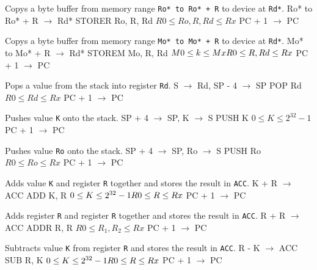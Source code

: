 \documentclass[titlepage]{scrartcl}
\begin{document}
{Copys a byte buffer from memory range \texttt{Ro* to Ro* + R} to device at \texttt{Rd*}.}
{Ro* to Ro* + R $\rightarrow$ Rd*}
{STORER Ro, R, Rd}
{$R0 \leq Ro, R, Rd \leq Rx$}
{PC + 1 $\rightarrow$ PC}
{}
{\srtable{}{}{}{}}

{Copys a byte buffer from memory range \texttt{Mo* to Mo* + R} to device at \texttt{Rd*}.}
{Mo* to Mo* + R $\rightarrow$ Rd*}
{STOREM Mo, R, Rd}
{$M0 \leq k \leq Mx \hfill \break R0 \leq R, Rd \leq Rx$}
{PC + 1 $\rightarrow$ PC}
{}
{\srtable{}{}{}{}}

{Pops a value from the stack into register \texttt{Rd}.}
{S $\rightarrow$ Rd, SP - 4 $\rightarrow$ SP}
{POP Rd}
{$R0 \leq Rd \leq Rx$}
{PC + 1 $\rightarrow$ PC}
{}
{\srtable{}{}{}{}}

{Pushes value \texttt{K} onto the stack.}
{SP + 4 $\rightarrow$ SP, K $\rightarrow$ S}
{PUSH K}
{$0 \leq K \leq 2^{32} - 1$}
{PC + 1 $\rightarrow$ PC}
{}
{\srtable{}{}{}{}}

{Pushes value \texttt{Ro} onto the stack.}
{SP + 4 $\rightarrow$ SP, Ro $\rightarrow$ S}
{PUSH Ro}
{$R0 \leq Ro \leq Rx$}
{PC + 1 $\rightarrow$ PC}
{}
{\srtable{}{}{}{}}

{Adds value \texttt{K} and register \texttt{R} together and stores the result in \texttt{ACC}.}
{K + R $\rightarrow$ ACC}
{ADD K, R}
{$0 \leq K \leq 2^{32} - 1 \hfill \break R0 \leq R \leq Rx$}
{PC + 1 $\rightarrow$ PC}
{}
{}

{Adds register \texttt{R} and register \texttt{R} together and stores the result in \texttt{ACC}.}
{R + R $\rightarrow$ ACC}
{ADDR R, R}
{$R0 \leq R_{1}, R_{2} \leq Rx$}
{PC + 1 $\rightarrow$ PC}
{}
{}

{Subtracts value \texttt{K} from register \texttt{R} and stores the result in \texttt{ACC}.}
{R - K $\rightarrow$ ACC}
{SUB R, K}
{$0 \leq K \leq 2^{32} - 1 \hfill \break R0 \leq R \leq Rx$}
{PC + 1 $\rightarrow$ PC}
{}
{}
\end{document}

